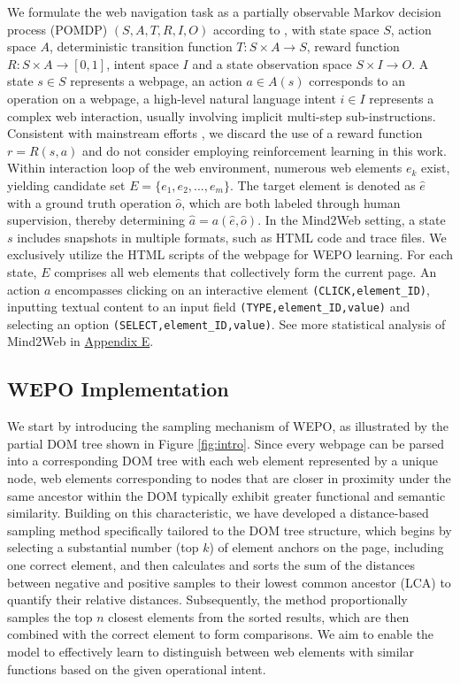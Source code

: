 \documentclass{article}
\begin{document}
  We formulate the web navigation task as a partially observable Markov decision process (POMDP) $(S, A, T, R, I, O)$ according to \citet{yao2022webshop}, with state space $S$, action space $A$, deterministic transition function $T:S \times A \rightarrow S$, reward function $R:S \times A \rightarrow [0,1]$, intent space $I$ and a state observation space $S \times I \rightarrow O$. A state $s \in S$ represents a webpage, an action $a \in A(s)$ corresponds to an operation on a webpage, a high-level natural language intent $i \in I$ represents a complex web interaction, usually involving implicit multi-step sub-instructions. Consistent with mainstream efforts \citep{deng2024mind2web,gur2023real}, we discard the use of a reward function \( r = R(s, a) \) and do not consider employing reinforcement learning in this work. Within interaction loop of the web environment, numerous web elements \( e_k \) exist, yielding candidate set \( E = \{ e_1, e_2, ... , e_m \} \). The target element is denoted as \( \hat{e} \) with a ground truth operation \( \hat{o} \), which are both labeled through human supervision, thereby determining \( \hat{a} = a(\hat{e},\hat{o}) \).
  In the Mind2Web \citep{deng2024mind2web} setting, a state \( s \) includes snapshots in multiple formats, such as HTML code and trace files. We exclusively utilize the HTML scripts of the webpage for WEPO learning. For each state, \( E \) comprises all web elements that collectively form the current page. An action \( a \) encompasses clicking on an interactive element \texttt{(CLICK,element\_ID)}, inputting textual content to an input field \texttt{(TYPE,element\_ID,value)} and selecting an option \texttt{(SELECT,element\_ID,value)}. See more statistical analysis of Mind2Web in \hyperref[sec:stat]{Appendix E}.
  
  \subsection{WEPO Implementation}
  
  We start by introducing the sampling mechanism of WEPO, as illustrated by the partial DOM tree shown in Figure \ref{fig:intro}. Since every webpage can be parsed into a corresponding DOM tree with each web element represented by a unique node, web elements corresponding to nodes that are closer in proximity under the same ancestor within the DOM typically exhibit greater functional and semantic similarity. Building on this characteristic, we have developed a distance-based sampling method specifically tailored to the DOM tree structure, which begins by selecting a substantial number (top \( k \)) of element anchors on the page, including one correct element, and then calculates and sorts the sum of the distances between negative and positive samples to their lowest common ancestor (LCA) to quantify their relative distances. Subsequently, the method proportionally samples the top \( n \) closest elements from the sorted results, which are then combined with the correct element to form comparisons. We aim to enable the model to effectively learn to distinguish between web elements with similar functions based on the given operational intent.
\end{document}
